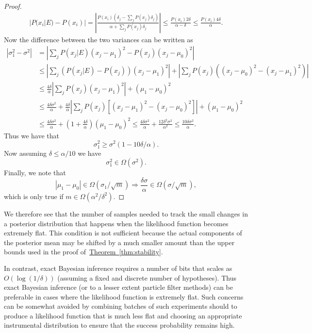 \documentclass[aps,pra,amsmath,twocolumn,amssymb,superscriptaddress]{revtex4-1}
\newcommand{\thm}[1]{\hyperref[thm:#1]{Theorem~\ref*{thm:#1}}}
\begin{document}
{\begin{proof}
\begin{align}
|P(x_i|E)-P(x_i)| = \left|\frac{P(x_i)(\delta_j-\sum_j P(x_j)\delta_j)}{\alpha+\sum_j P(x_j)\delta_j}\right|\le \frac{P(x_i) 2\delta}{\alpha-\delta}\le \frac{P(x_i) 4\delta}{\alpha}.
\end{align}
Now the difference between the two variances can be written as
\begin{align}
|\sigma_1^2-\sigma^2| &= \left|\sum_j  P(x_j|E)(x_j-\mu_1)^2-P(x_j)(x_j-\mu_0)^2\right|\nonumber\\
 &\le \left|\sum_j  (P(x_j|E)-P(x_j))(x_j-\mu_1)^2\right|+\left|\sum_j P(x_j)\left((x_j-\mu_0)^2-(x_j-\mu_1)^2\right)\right|\nonumber\\
 &\le  \frac{4\delta}{\alpha}\left|\sum_j  P(x_j)(x_j-\mu_1)^2\right|+(\mu_1-\mu_0)^2\nonumber\\
&\le \frac{4\delta\sigma^2}{\alpha}+\frac{4\delta}{\alpha}\left|\sum_j P(x_j)[(x_j-\mu_1)^2-(x_j-\mu_0)^2]  \right|+(\mu_1-\mu_0)^2\nonumber\\
&\le \frac{4\delta\sigma^2}{\alpha}+(1+\frac{4\delta}{\alpha})(\mu_1-\mu_0)^2\le \frac{4\delta\sigma^2}{\alpha}+ \frac{12\delta^2\sigma^2}{\alpha^2}\le \frac{10\delta\sigma^2}{\alpha}.
\end{align}
Thus we have that
\begin{equation}
\sigma_1^2 \ge \sigma^2(1-10\delta/\alpha).
\end{equation}
Now assuming $\delta\le \alpha/10$ we have 
\begin{equation}
\sigma_1^2\in \Omega(\sigma^2).
\end{equation}
Finally, we note that
\begin{equation}
|\mu_1-\mu_0| \in \Omega(\sigma_1/\sqrt{m}) \Rightarrow \frac{\delta \sigma}{\alpha} \in \Omega(\sigma/\sqrt{m}),
\end{equation}
which is only true if $m\in \Omega(\alpha^2/\delta^2)$.
\end{proof}
We therefore see that the number of samples needed to track the small changes in a posterior distribution that happens when the likelihood function becomes extremely flat.  This condition is not sufficient because the actual components of the posterior mean may be shifted by a much smaller amount than the upper bounds used in the proof of~\thm{stability}.

In contrast, exact Bayesian inference requires a number of bits that scales as $O(\log(1/\delta))$ (assuming a fixed and discrete number of hypotheses).  Thus exact Bayesian inference (or to a lesser extent particle filter methods) can be preferable in cases where the likelihood function is extremely flat.  Such concerns can be somewhat  avoided  by combining batches of such experiments should to produce a likelihood function that is much less flat and choosing an appropriate instrumental distribution to ensure that the success probability remains high.

}
\end{document}
